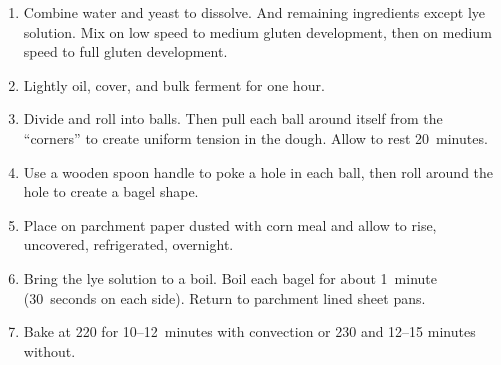 
\begin{minipage}{.49\textwidth}

  \begin{ingredients}
  \end{ingredients}
\end{minipage}
\begin{minipage}{.49\textwidth}

  \begin{ingredients}
  \end{ingredients}
\end{minipage}

\begin{recipe}
  \begin{enumerate}

  \item Combine water and yeast to dissolve.  And remaining
    ingredients except lye solution.  Mix on low speed to medium
    gluten development, then on medium speed to full gluten
    development.

  \item Lightly oil, cover, and bulk ferment for one hour.

  \item Divide and roll into balls.  Then pull each ball around itself
    from the ``corners'' to create uniform tension in the dough.
    Allow to rest 20~minutes.

  \item Use a wooden spoon handle to poke a hole in each ball, then
    roll around the hole to create a bagel shape.

  \item Place on parchment paper dusted with corn meal and allow to
    rise, uncovered, refrigerated, overnight.

  \item Bring the lye solution to a boil.  Boil each bagel for about
    1~minute (30~seconds on each side).  Return to parchment lined
    sheet pans.

  \item Bake at 220\degreeC{} for 10--12~minutes with convection or
    230\degreeC{} and 12--15 minutes without.

  \end{enumerate}
\end{recipe}
